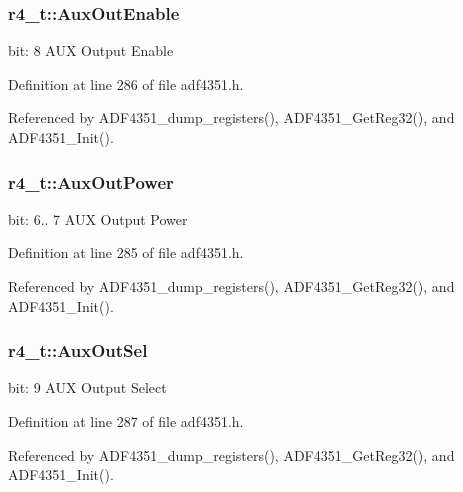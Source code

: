 \subsubsection[{\texorpdfstring{Aux\+Out\+Enable}{AuxOutEnable}}]{ r4\+\_\+t\+::\+Aux\+Out\+Enable}\hypertarget{structr4__t_ab6c43ed3da1189c3de8cf2cafafb03f3}{}\label{structr4__t_ab6c43ed3da1189c3de8cf2cafafb03f3}
bit\+: 8 A\+UX Output Enable 

Definition at line 286 of file adf4351.\+h.



Referenced by A\+D\+F4351\+\_\+dump\+\_\+registers(), A\+D\+F4351\+\_\+\+Get\+Reg32(), and A\+D\+F4351\+\_\+\+Init().

\subsubsection[{\texorpdfstring{Aux\+Out\+Power}{AuxOutPower}}]{ r4\+\_\+t\+::\+Aux\+Out\+Power}\hypertarget{structr4__t_a92b00824868c7911a73217cbdd48ca96}{}\label{structr4__t_a92b00824868c7911a73217cbdd48ca96}
bit\+: 6.. 7 A\+UX Output Power 

Definition at line 285 of file adf4351.\+h.



Referenced by A\+D\+F4351\+\_\+dump\+\_\+registers(), A\+D\+F4351\+\_\+\+Get\+Reg32(), and A\+D\+F4351\+\_\+\+Init().

\subsubsection[{\texorpdfstring{Aux\+Out\+Sel}{AuxOutSel}}]{ r4\+\_\+t\+::\+Aux\+Out\+Sel}\hypertarget{structr4__t_af75cec4d15f4f2e086db3be6d4c3c215}{}\label{structr4__t_af75cec4d15f4f2e086db3be6d4c3c215}
bit\+: 9 A\+UX Output Select 

Definition at line 287 of file adf4351.\+h.



Referenced by A\+D\+F4351\+\_\+dump\+\_\+registers(), A\+D\+F4351\+\_\+\+Get\+Reg32(), and A\+D\+F4351\+\_\+\+Init().

